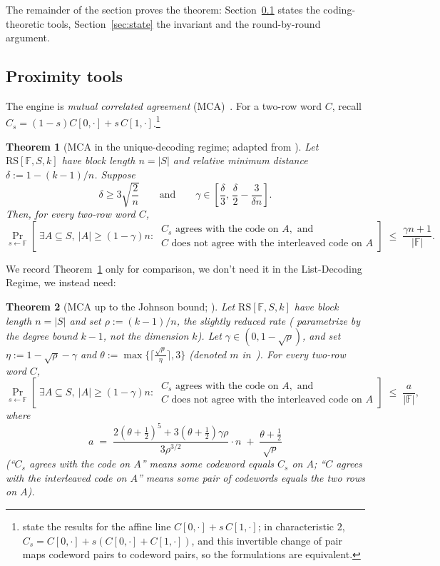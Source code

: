 \documentclass[11pt]{article}
\newcommand{\F}{\mathbb{F}}
\newcommand{\RS}{\mathrm{RS}}
\theoremstyle{plain}
\newtheorem{theorem}{Theorem}[section]
\theoremstyle{definition}
\theoremstyle{remark}
\begin{document}
The remainder of the section proves the theorem: Section~\ref{sec:tools} states the coding-theoretic tools, Section~\ref{sec:state} the invariant and the round-by-round argument.

\subsection{Proximity tools}\label{sec:tools}

The engine is \emph{mutual correlated agreement} (MCA)~\cite{ACFY25}. For a two-row word $C$, recall $C_s = (1-s)C[0,\cdot] + s\,C[1,\cdot]$.\footnote{\cite{BCHKS25} state the results for the affine line $C[0,\cdot] + s\,C[1,\cdot]$; in characteristic $2$, $C_s = C[0,\cdot] + s(C[0,\cdot] + C[1,\cdot])$, and this invertible change of pair maps codeword pairs to codeword pairs, so the formulations are equivalent.}

\begin{theorem}[MCA in the unique-decoding regime; adapted from {\cite[Cor.~1.4]{BCHKS25}}]\label{thm:mca-udr}
Let $\RS[\F,S,k]$ have block length $n = |S|$ and relative minimum distance $\delta := 1 - (k-1)/n$. Suppose
\[
\delta \ge 3\sqrt{\frac{2}{n}}
\qquad\text{and}\qquad
\gamma \in \left[\frac{\delta}{3},\,\frac{\delta}{2} - \frac{3}{\delta n}\right].
\]
Then, for every two-row word $C$,
\[
\Pr_{s \leftarrow \F}\!\left[\; \exists A \subseteq S,\ |A| \ge (1-\gamma) n :\ \begin{array}{l} C_s \text{ agrees with the code on } A, \text{ and} \\ C \text{ does not agree with the interleaved code on } A \end{array} \right]
\;\le\; \frac{\gamma n + 1}{|\F|}.
\]
\end{theorem}

We record Theorem~\ref{thm:mca-udr} only for comparison, we don't need it in the List-Decoding Regime, we instead need:

\begin{theorem}[MCA up to the Johnson bound; {\cite[Thm.~4.6]{BCHKS25}}]\label{thm:mca-johnson}
Let $\RS[\F,S,k]$ have block length $n = |S|$ and set $\rho := (k-1)/n$, the \emph{slightly reduced rate} (\cite{BCHKS25} parametrize by the degree bound $k - 1$, not the dimension $k$). Let $\gamma \in (0, 1-\sqrt{\rho})$, and set $\eta := 1 - \sqrt{\rho} - \gamma$ and $\theta := \max\{\lceil \tfrac{\sqrt{\rho}}{\eta} \rceil, 3\}$ (denoted $m$ in~\cite{BCHKS25}). For every two-row word $C$,
\[
\Pr_{s \leftarrow \F}\!\left[\; \exists A \subseteq S,\ |A| \ge (1-\gamma) n :\ \begin{array}{l} C_s \text{ agrees with the code on } A, \text{ and} \\ C \text{ does not agree with the interleaved code on } A \end{array} \right] \;\le\; \frac{a}{|\F|},
\]
where
\[
a \;=\; \frac{2(\theta + \tfrac12)^5 + 3(\theta + \tfrac12)\gamma\rho}{3\rho^{3/2}} \cdot n \;+\; \frac{\theta + \tfrac12}{\sqrt{\rho}}
\]
(``$C_s$ agrees with the code on $A$'' means some codeword equals $C_s$ on $A$; ``$C$ agrees with the interleaved code on $A$'' means some pair of codewords equals the two rows on $A$).
\end{theorem}
\end{document}
